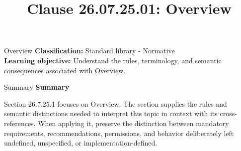\documentclass[10pt,letterpaper]{article}
\title{Clause 26.07.25.01: Overview}
\author{}
\date{}
\begin{document}
\maketitle
\begin{CornellOverviewBox}{Overview}
\textbf{Classification:} Standard library - Normative\\[2pt]
\textbf{Learning objective:} Understand the rules, terminology, and semantic consequences associated with Overview.
\end{CornellOverviewBox}\begin{CornellSummaryBox}{Summary}
{\sffamily\bfseries\color{Accent} Summary}\par\vspace{3pt}Section 26.7.25.1 focuses on Overview. The section supplies the rules and semantic distinctions needed to interpret this topic in context with its cross-references. When applying it, preserve the distinction between mandatory requirements, recommendations, permissions, and behavior deliberately left undefined, unspecified, or implementation-defined.
\end{CornellSummaryBox}
\end{document}
